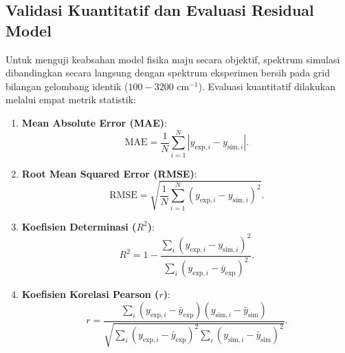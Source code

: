 \subsection{Validasi Kuantitatif dan Evaluasi Residual Model}
Untuk menguji keabsahan model fisika maju secara objektif, spektrum simulasi dibandingkan secara langsung dengan spektrum eksperimen bersih pada grid bilangan gelombang identik ($100 - 3200\text{ cm}^{-1}$). Evaluasi kuantitatif dilakukan melalui empat metrik statistik:
\begin{enumerate}
    \item \textbf{Mean Absolute Error (MAE)}:
    \begin{equation}
    \mathrm{MAE} = \frac{1}{N} \sum_{i=1}^N |y_{\mathrm{exp}, i} - y_{\mathrm{sim}, i}|.
    \end{equation}
    \item \textbf{Root Mean Squared Error (RMSE)}:
    \begin{equation}
    \mathrm{RMSE} = \sqrt{\frac{1}{N} \sum_{i=1}^N (y_{\mathrm{exp}, i} - y_{\mathrm{sim}, i})^2}.
    \end{equation}
    \item \textbf{Koefisien Determinasi ($R^2$)}:
    \begin{equation}
    R^2 = 1 - \frac{\sum_i (y_{\mathrm{exp}, i} - y_{\mathrm{sim}, i})^2}{\sum_i (y_{\mathrm{exp}, i} - \bar{y}_{\mathrm{exp}})^2}.
    \end{equation}
    \item \textbf{Koefisien Korelasi Pearson ($r$)}:
    \begin{equation}
    r = \frac{\sum_i (y_{\mathrm{exp}, i} - \bar{y}_{\mathrm{exp}})(y_{\mathrm{sim}, i} - \bar{y}_{\mathrm{sim}})}{\sqrt{\sum_i (y_{\mathrm{exp}, i} - \bar{y}_{\mathrm{exp}})^2 \sum_i (y_{\mathrm{sim}, i} - \bar{y}_{\mathrm{sim}})^2}}.
    \end{equation}
\end{enumerate}


